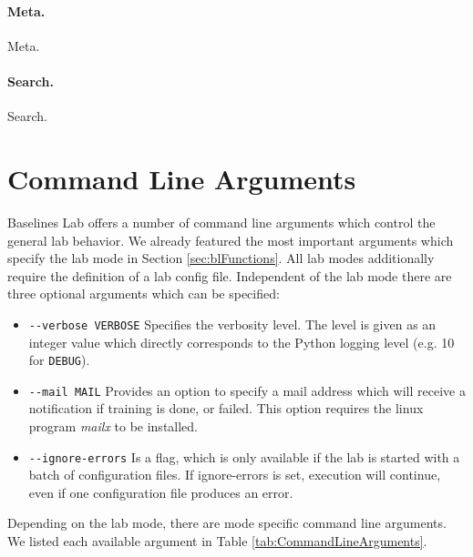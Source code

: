\paragraph{Meta.} Meta.

\paragraph{Search.} Search.


\section{Command Line Arguments} \label{sec:BLCommandLine}
Baselines Lab offers a number of command line arguments which control the general lab behavior. We already featured the most important arguments which specify the lab mode in Section \ref{sec:blFunctions}. All lab modes additionally require the definition of a lab config file. Independent of the lab mode there are three optional arguments which can be specified:

\begin{itemize}
    \item \texttt{-{}-verbose VERBOSE} Specifies the verbosity level. The level is given as an integer value which directly corresponds to the Python logging level (e.g. 10 for \texttt{DEBUG}).
    \item \texttt{-{}-mail MAIL} Provides an option to specify a mail address which will receive a notification if training is done, or failed. This option requires the linux program \textit{mailx} to be installed.
    \item \texttt{-{}-ignore-errors} Is a flag, which is only available if the lab is started with a batch of configuration files. If ignore-errors is set, execution will continue, even if one configuration file produces an error. 
\end{itemize}

Depending on the lab mode, there are mode specific command line arguments. We listed each available argument in Table \ref{tab:CommandLineArguments}.

